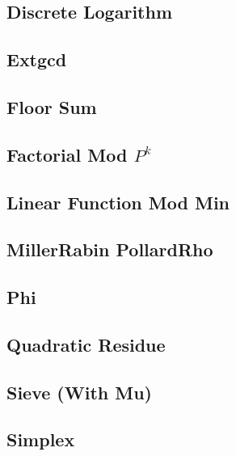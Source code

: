\subsection{Discrete Logarithm}

\subsection{Extgcd}

%
\subsection{Floor Sum}

\subsection{Factorial Mod $P^k$}

\subsection{Linear Function Mod Min}

%
\subsection{MillerRabin PollardRho}

\subsection{Phi}

\subsection{Quadratic Residue}

\subsection{Sieve (With Mu)}

\subsection{Simplex}

